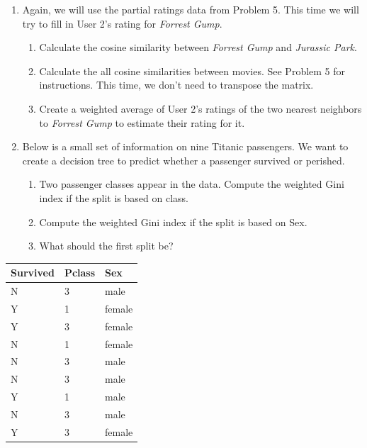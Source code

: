 \documentclass[
]{book}
\providecommand{\tightlist}{%
  \setlength{\itemsep}{0pt}\setlength{\parskip}{0pt}}
\theoremstyle{definition}
\theoremstyle{definition}
\theoremstyle{definition}
\theoremstyle{definition}
\theoremstyle{remark}
\begin{document}
\begin{enumerate}
\def\labelenumi{\arabic{enumi}.}
\setcounter{enumi}{5}
\tightlist
\item
  Again, we will use the partial ratings data from Problem 5. This time we will try to fill in User 2's rating for \emph{Forrest Gump}.

  \begin{enumerate}
  \def\labelenumii{\alph{enumii}.}
  \tightlist
  \item
    Calculate the cosine similarity between \emph{Forrest Gump} and \emph{Jurassic Park}.
  \item
    Calculate the all cosine similarities between movies. See Problem 5 for instructions. This time, we don't need to transpose the matrix.
  \item
    Create a weighted average of User 2's ratings of the two nearest neighbors to \emph{Forrest Gump} to estimate their rating for it.
  \end{enumerate}
\item
  Below is a small set of information on nine Titanic passengers. We want to create a decision tree to predict whether a passenger survived or perished.

  \begin{enumerate}
  \def\labelenumii{\alph{enumii}.}
  \tightlist
  \item
    Two passenger classes appear in the data. Compute the weighted Gini index if the split is based on class.
  \item
    Compute the weighted Gini index if the split is based on Sex.
  \item
    What should the first split be?
  \end{enumerate}
\end{enumerate}

\begin{longtable}[]{@{}lll@{}}
\toprule\noalign{}
Survived & Pclass & Sex \\
\midrule\noalign{}
\endhead
\bottomrule\noalign{}
\endlastfoot
N & 3 & male \\
Y & 1 & female \\
Y & 3 & female \\
N & 1 & female \\
N & 3 & male \\
N & 3 & male \\
Y & 1 & male \\
N & 3 & male \\
Y & 3 & female \\
\end{longtable}
\end{document}
